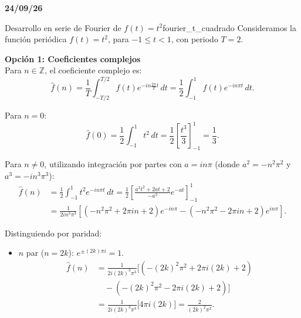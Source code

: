 \textbf{24/09/26}
\begin{ejemplo}{Desarrollo en serie de Fourier de $f(t) = t^2$}{fourier_t_cuadrado}
Consideramos la función periódica $f(t) = t^2$, para $-1 \le t < 1$, con periodo $T = 2$.

\begin{center}
\end{center}

\textbf{Opción 1: Coeficientes complejos} \\
Para $n \in \mathbb{Z}$, el coeficiente complejo es:
\[
\hat{f}(n) = \frac{1}{T} \int_{-T/2}^{T/2} f(t) e^{-i n \frac{2\pi}{T} t} \, dt = \frac{1}{2} \int_{-1}^{1} f(t) e^{-i n \pi t} \, dt.
\]

Para $n = 0$:
\[
\hat{f}(0) = \frac{1}{2} \int_{-1}^{1} t^2 \, dt = \frac{1}{2} \left[ \frac{t^3}{3} \right]_{-1}^{1} = \frac{1}{3}.
\]

Para $n \neq 0$, utilizando integración por partes con $a = i n \pi$ (donde $a^2 = -n^2\pi^2$ y $a^3 = -i n^3 \pi^3$):
\begin{align*}
\hat{f}(n) &= \frac{1}{2} \int_{-1}^{1} t^2 e^{-i n \pi t} \, dt = \frac{1}{2} \left[ \frac{a^2 t^2 + 2at + 2}{-a^3} e^{-a t} \right]_{-1}^{1} \\
&= \frac{1}{2 i n^3 \pi^3} \left[ (-n^2\pi^2 + 2\pi i n + 2) e^{-i n \pi} - (-n^2\pi^2 - 2\pi i n + 2) e^{i n \pi} \right].
\end{align*}

Distinguiendo por paridad:
\begin{itemize}
    \item $n$ par ($n = 2k$): $e^{\pm(2k)\pi i} = 1$.
    \begin{align*}
        \hat{f}(n) &= \frac{1}{2 i (2k)^3 \pi^3} \Big[ \left(-(2k)^2\pi^2 + 2\pi i (2k) + 2\right) \\
        &\quad - \left(-(2k)^2\pi^2 - 2\pi i (2k) + 2\right) \Big] \\
        &= \frac{1}{2 i (2k)^3 \pi^3} \big[ 4\pi i (2k) \big] = \frac{2}{(2k)^2 \pi^2}.
    \end{align*}
    

\end{itemize}
\end{ejemplo}
